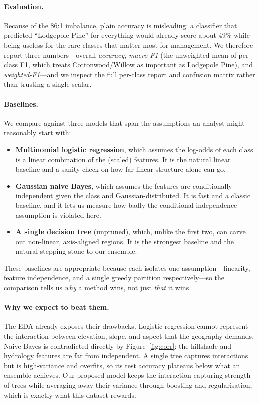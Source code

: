 \documentclass[sigconf,nonacm]{acmart}
\begin{document}
\paragraph{Evaluation.}
Because of the 86:1 imbalance, plain accuracy is misleading: a classifier that
predicted ``Lodgepole Pine'' for everything would already score about 49\%
while being useless for the rare classes that matter most for management. We
therefore report three numbers---overall \emph{accuracy}, \emph{macro-F1}
(the unweighted mean of per-class F1, which treats Cottonwood/Willow as
important as Lodgepole Pine), and \emph{weighted-F1}---and we inspect the full
per-class report and confusion matrix rather than trusting a single scalar.

\paragraph{Baselines.}
We compare against three models that span the assumptions an analyst might
reasonably start with:
\begin{itemize}
\item \textbf{Multinomial logistic regression}, which assumes the log-odds of
each class is a linear combination of the (scaled) features. It is the natural
linear baseline and a sanity check on how far linear structure alone can go.
\item \textbf{Gaussian naive Bayes}, which assumes the features are
conditionally independent given the class and Gaussian-distributed. It is fast
and a classic baseline, and it lets us measure how badly the
conditional-independence assumption is violated here.
\item \textbf{A single decision tree} (unpruned), which, unlike the first two,
can carve out non-linear, axis-aligned regions. It is the strongest baseline and
the natural stepping stone to our ensemble.
\end{itemize}
These baselines are appropriate because each isolates one assumption---linearity,
feature independence, and a single greedy partition respectively---so the
comparison tells us \emph{why} a method wins, not just \emph{that} it wins.

\paragraph{Why we expect to beat them.}
The EDA already exposes their drawbacks. Logistic regression cannot represent the
interaction between elevation, slope, and aspect that the geography demands.
Naive Bayes is contradicted directly by Figure~\ref{fig:corr}: the hillshade and
hydrology features are far from independent. A single tree captures interactions
but is high-variance and overfits, so its test accuracy plateaus below what an
ensemble achieves. Our proposed model keeps the interaction-capturing strength of
trees while averaging away their variance through boosting and regularisation,
which is exactly what this dataset rewards.
\end{document}
